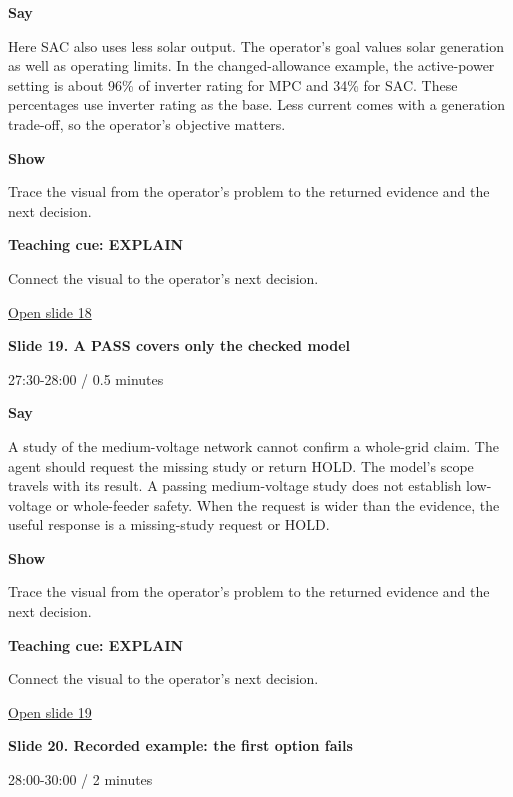 \documentclass[12pt,letterpaper]{article}
\begin{document}
\textbf{Say}\par Here SAC also uses less solar output. The operator's goal values solar generation as well as operating limits. In the changed-allowance example, the active-power setting is about 96\% of inverter rating for MPC and 34\% for SAC. These percentages use inverter rating as the base. Less current comes with a generation trade-off, so the operator's objective matters.\par\medskip
\textbf{Show}\par Trace the visual from the operator's problem to the returned evidence and the next decision.\par\medskip
\textbf{Teaching cue: EXPLAIN}\par Connect the visual to the operator's next decision.\par\medskip
\vfill\href{https://alaaselim-sudo.github.io/GridGuard-Agentic-AI-Tutorials/operator-cases/#/18}{Open slide 18}\par
\clearpage{}
{\Large\bfseries\color{IEEEBlue} Slide 19. A PASS covers only the checked model\par}\medskip
{\small\color{Slate} 27:30-28:00 /\allowbreak{} 0.5 minutes\par}\medskip
\textbf{Say}\par A study of the medium-voltage network cannot confirm a whole-grid claim. The agent should request the missing study or return HOLD. The model's scope travels with its result. A passing medium-voltage study does not establish low-voltage or whole-feeder safety. When the request is wider than the evidence, the useful response is a missing-study request or HOLD.\par\medskip
\textbf{Show}\par Trace the visual from the operator's problem to the returned evidence and the next decision.\par\medskip
\textbf{Teaching cue: EXPLAIN}\par Connect the visual to the operator's next decision.\par\medskip
\vfill\href{https://alaaselim-sudo.github.io/GridGuard-Agentic-AI-Tutorials/operator-cases/#/19}{Open slide 19}\par
\clearpage{}
{\Large\bfseries\color{IEEEBlue} Slide 20. Recorded example: the first option fails\par}\medskip
{\small\color{Slate} 28:00-30:00 /\allowbreak{} 2 minutes\par}\medskip
\end{document}
